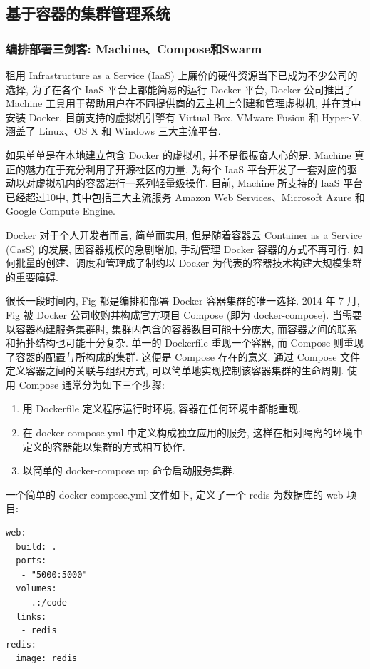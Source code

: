 \documentclass[UTF8,a4paper]{ctexart}
\begin{document}
\subsection{基于容器的集群管理系统}
\subsubsection{编排部署三剑客: Machine、Compose和Swarm}
租用 Infrastructure as a Service (IaaS) 上廉价的硬件资源当下已成为不少公司的选择, 为了在各个 IaaS 平台上都能简易的运行 Docker 平台, Docker 公司推出了 Machine\cite{Docker-machine} 工具用于帮助用户在不同提供商的云主机上创建和管理虚拟机, 并在其中安装 Docker. 目前支持的虚拟机引擎有 Virtual Box, VMware Fusion 和 Hyper-V, 涵盖了 Linux、OS X 和 Windows 三大主流平台.

如果单单是在本地建立包含 Docker 的虚拟机, 并不是很振奋人心的是. Machine 真正的魅力在于充分利用了开源社区的力量, 为每个 IaaS 平台开发了一套对应的驱动以对虚拟机内的容器进行一系列轻量级操作. 目前, Machine 所支持的 IaaS 平台已经超过10中, 其中包括三大主流服务 Amazon Web Services、Microsoft Azure 和 Google Compute Engine.

Docker 对于个人开发者而言, 简单而实用, 但是随着容器云 Container as a Service (CasS) 的发展, 因容器规模的急剧增加, 手动管理 Docker 容器的方式不再可行. 如何批量的创建、调度和管理成了制约以 Docker 为代表的容器技术构建大规模集群的重要障碍.

很长一段时间内, Fig 都是编排和部署 Docker 容器集群的唯一选择. 2014 年 7 月, Fig 被 Docker 公司收购并构成官方项目 Compose (即为 docker-compose)\cite{Docker-compse}. 当需要以容器构建服务集群时, 集群内包含的容器数目可能十分庞大, 而容器之间的联系和拓扑结构也可能十分复杂. 单一的 Dockerfile 重现一个容器, 而 Compose 则重现了容器的配置与所构成的集群. 这便是 Compose 存在的意义. 通过 Compose 文件定义容器之间的关联与组织方式, 可以简单地实现控制该容器集群的生命周期. 使用 Compose 通常分为如下三个步骤:
\begin{enumerate}
    \item 用 Dockerfile 定义程序运行时环境, 容器在任何环境中都能重现.
    \item 在 docker-compose.yml 中定义构成独立应用的服务, 这样在相对隔离的环境中定义的容器能以集群的方式相互协作.
    \item 以简单的 docker-compose up 命令启动服务集群.
\end{enumerate}

一个简单的 docker-compose.yml 文件如下, 定义了一个 redis 为数据库的 web 项目:
\begin{lstlisting}[backgroundcolor = \color{white-gray}, framexleftmargin = 1em]
web:
  build: .
  ports:
   - "5000:5000"
  volumes:
   - .:/code
  links:
   - redis
redis:
  image: redis
\end{lstlisting}
\end{document}
